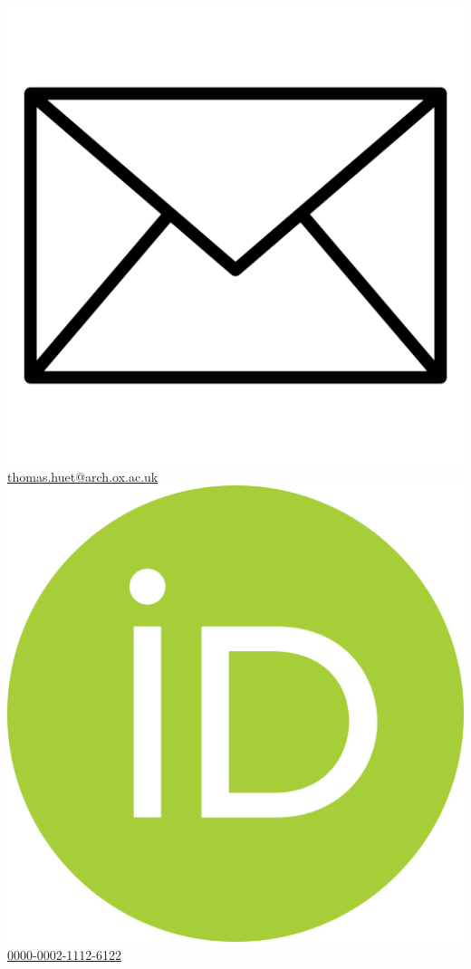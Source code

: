 \documentclass{article}
\begin{document}
\includegraphics[scale=0.025]{gmail} \quad \href{mailto:thomas.huet@arch.ox.ac.uk}{thomas.huet@arch.ox.ac.uk} \\
\includegraphics[scale=0.01]{orcid} \quad \href{https://orcid.org/0000-0002-1112-6122}{0000-0002-1112-6122} \\
\end{document}

